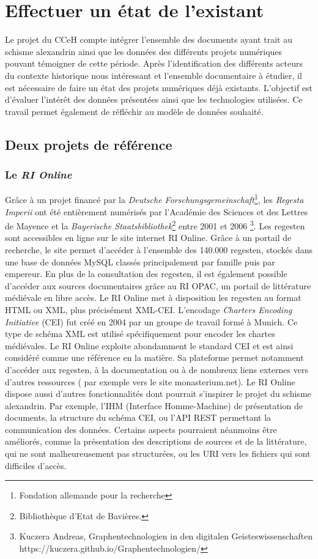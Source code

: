 \chapter{Effectuer un état de l'existant}

Le projet du CCeH compte intégrer l’ensemble des documents ayant trait au schisme alexandrin ainsi que les données des différents projets numériques pouvant témoigner de cette période. Après l’identification des différents acteurs du contexte historique nous intéressant et l’ensemble documentaire à étudier, il est nécessaire de faire un état des projets numériques déjà existants. L’objectif est d’évaluer l’intérêt des données présentées ainsi que les technologies utilisées. Ce travail permet également de réfléchir au modèle de données souhaité. 


    \section{Deux projets de référence}

    \subsection{Le \textit{RI Online}}

Grâce à un projet financé par la \textit{Deutsche Forschungsgemeinschaft}\footnote{Fondation allemande pour la recherche}, les \textit{Regesta Imperii} ont été entièrement numérisés par l’Académie des Sciences et des Lettres de Mayence et la \textit{Bayerische Staatsbibliothek}\footnote{Bibliothèque d’Etat de Bavières.} entre 2001 et 2006 \footnote{Kuczera Andreas, Graphentechnologien in den digitalen Geisteswissenschaften https://kuczera.github.io/Graphentechnologien/ }. Les regesten sont accessibles en ligne sur le site internet RI Online.
Grâce à un portail de recherche, le site permet d’accéder à l’ensemble des 140.000 regesten, stockés dans une base de données MySQL classés principalement par famille puis par empereur. En plus de la consultation des regesten, il est également possible d’accéder aux sources documentaires grâce au RI OPAC, un portail de littérature médiévale en libre accès.
Le RI Online met à disposition les regesten au format HTML ou XML, plus précisément XML-CEI. L’encodage \textit{Charters Encoding Initiative} (CEI) fut créé en 2004 par un groupe de travail formé à Munich. Ce type de schéma XML est utilisé spécifiquement pour encoder les chartes médiévales. Le RI Online exploite abondamment le standard CEI et est ainsi considéré comme une référence en la matière. Sa plateforme permet notamment d’accéder aux regesten, à la documentation ou à de nombreux liens externes vers d’autres ressources ( par exemple vers le site monasterium.net). Le RI Online dispose aussi d’autres fonctionnalités dont pourrait  s’inspirer le projet du schisme alexandrin. Par exemple, l’IHM (Interface Homme-Machine)  de présentation de documents,  la structure  du schéma CEI, ou  l’API REST permettant la communication des données. 
Certains aspects pourraient néanmoins être améliorés, comme la présentation des descriptions de sources et de la littérature, qui ne sont malheureusement pas structurées, ou les URI vers les fichiers qui sont difficiles d’accès. 



